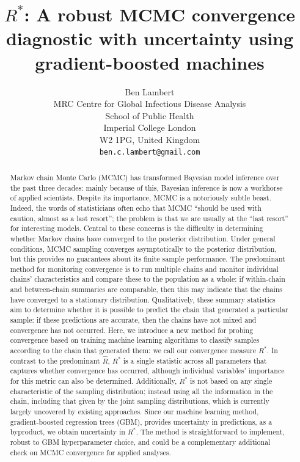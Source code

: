 \documentclass{article}
\title{$R^*$: A robust MCMC convergence diagnostic with uncertainty using gradient-boosted machines}
\author{%
	 Ben Lambert\\
	 MRC Centre for Global Infectious Disease Analysis\\
	 School of Public Health\\
	 Imperial College London\\
	 W2 1PG, United Kingdom\\
	 \texttt{ben.c.lambert@gmail.com} \\
}
\begin{document}

\maketitle

\begin{abstract}
	Markov chain Monte Carlo (MCMC) has transformed Bayesian model inference over the past three decades: mainly because of this, Bayesian inference is now a workhorse of applied scientists. Despite its importance, MCMC is a notoriously subtle beast. Indeed, the words of statisticians often echo that MCMC ``should be used with caution, almost as a last resort''; the problem is that we are usually at the ``last resort'' for interesting models. Central to these concerns is the difficulty in determining whether Markov chains have converged to the posterior distribution. Under general conditions, MCMC sampling converges asymptotically to the posterior distribution, but this provides no guarantees about its finite sample performance. The predominant method for monitoring convergence is to run multiple chains and monitor individual chains' characteristics and compare these to the population as a whole: if within-chain and between-chain summaries are comparable, then this may indicate that the chains have converged to a stationary distribution. Qualitatively, these summary statistics aim to determine whether it is possible to predict the chain that generated a particular sample: if these predictions are accurate, then the chains have not mixed and convergence has not occurred. Here, we introduce a new method for probing convergence based on training machine learning algorithms to classify samples according to the chain that generated them: we call our convergence measure $R^*$. In contrast to the predominant $\hat{R}$, $R^*$ is a single statistic across all parameters that captures whether convergence has occurred, although individual variables' importance for this metric can also be determined. Additionally, $R^*$ is not based on any single characteristic of the sampling distribution; instead using all the information in the chain, including that given by the joint sampling distributions, which is currently largely uncovered by existing approaches. Since our machine learning method, gradient-boosted regression trees (GBM), provides uncertainty in predictions, as a byproduct, we obtain uncertainty in $R^*$. The method is straightforward to implement, robust to GBM hyperparameter choice, and could be a complementary additional check on MCMC convergence for applied analyses.
\end{abstract}
\end{document}
